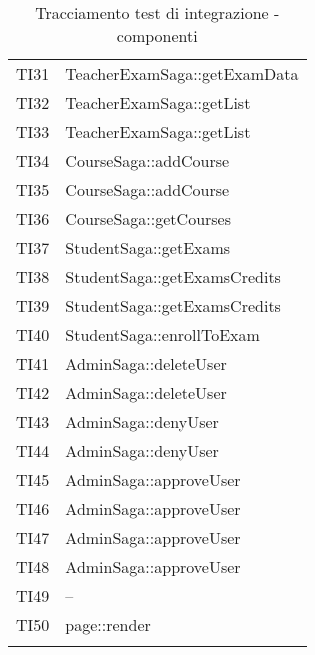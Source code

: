 \documentclass[PianoDiQualifica.tex]{subfiles}
\begin{document}
\begin{longtable}[H]{P{2cm}P{11.5cm}}
	TI31 & TeacherExamSaga::getExamData \\
	TI32 & TeacherExamSaga::getList \\
	TI33 & TeacherExamSaga::getList \\
	TI34 & CourseSaga::addCourse \\
	TI35 & CourseSaga::addCourse \\
	TI36 & CourseSaga::getCourses \\
	TI37 & StudentSaga::getExams \\
	TI38 & StudentSaga::getExamsCredits \\
	TI39 & StudentSaga::getExamsCredits \\
	TI40 & StudentSaga::enrollToExam \\
	TI41 & AdminSaga::deleteUser \\
	TI42 & AdminSaga::deleteUser \\
	TI43 & AdminSaga::denyUser \\
	TI44 & AdminSaga::denyUser \\
	TI45 & AdminSaga::approveUser \\
	TI46 & AdminSaga::approveUser \\
	TI47 & AdminSaga::approveUser \\
	TI48 & AdminSaga::approveUser \\
	TI49 & -- \\
	TI50 & page::render \\
	\hiderowcolors
	\caption{Tracciamento test di integrazione - componenti}
\end{longtable}
\end{document}
